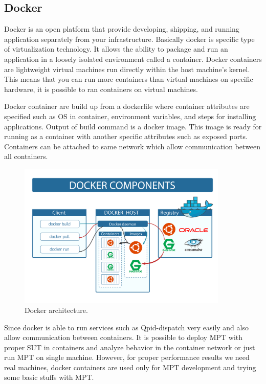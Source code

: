 \subsection{Docker}
Docker \cite{Docker} is an open platform that provide developing, shipping, and running application separately from your infrastructure. Basically docker is specific type of virtualization technology. It allows the ability to package and run an application in a loosely isolated environment called a container. Docker containers are lightweight virtual machines run directly within the host machine's kernel. This means that you can run more containers than virtual machines on specific hardware, it is possible to ran containers on virtual machines.

Docker container are build up from a dockerfile where container attributes are specified such as OS in container, environment variables, and steps for installing applications. Output of build command is a docker image. This image is ready for running as a container with another specific attributes such as exposed ports. Containers can be attached to same network which allow communication between all containers.

\begin{figure}[H]
  \centering
  \includegraphics[width=10cm]{obrazky-figures/docker.png}
  \caption{Docker architecture. }
  \label{fig:ansible_architecture}
\end{figure}


Since docker is able to run services such as Qpid-dispatch very easily and also allow communication between containers. It is possible to deploy MPT with proper SUT in containers and analyze behavior in the container network or just run MPT on single machine. However, for proper performance results we need real machines, docker containers are used only for MPT development and trying some basic stuffs with MPT.


